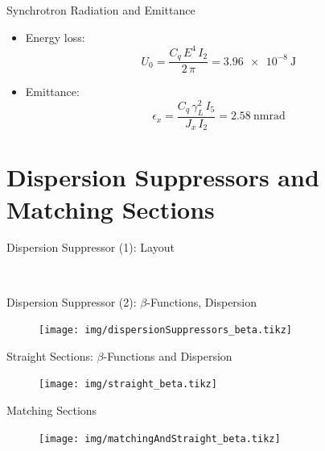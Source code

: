 \documentclass{beamer}
\begin{document}
\begin{frame}[t]{Synchrotron Radiation and Emittance}
\begin{itemize}
\item Energy loss:
\begin{equation*}
U_0 = \frac{C_q\,E^4\,I_2}{2\,\pi}=\SI{3.96e-8}{\joule}
\end{equation*}
\item Emittance:
\begin{equation*}
\epsilon_x = \frac{C_q\,\gamma_L^2\,I_5}{J_x\,I_2}=\SI{2.58}{\nano\meter\radian}
\end{equation*}
\end{itemize}
\end{frame}





\section{Dispersion Suppressors and Matching Sections}
\begin{frame}[t]{Dispersion Suppressor (1): Layout}
\begin{figure}
  \centering
  \\
\end{figure}
\end{frame}

\begin{frame}[t,fragile]{Dispersion Suppressor (2): $\beta$-Functions, Dispersion}
\begin{figure}
\centering
\texttt{[image: img/dispersionSuppressors\_beta.tikz]}
\end{figure}
\end{frame}


\begin{frame}[t,fragile]{Straight Sections: $\beta$-Functions and Dispersion}
\begin{figure}
\centering
\texttt{[image: img/straight\_beta.tikz]}
\end{figure}
\end{frame}


\begin{frame}[t,fragile]{Matching Sections}
\begin{figure}
\centering
\texttt{[image: img/matchingAndStraight\_beta.tikz]}
\end{figure}
\end{frame}
\end{document}
